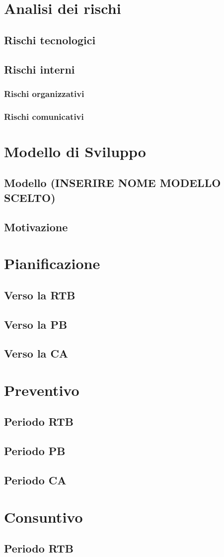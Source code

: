 \documentclass[5pt]{article}
\begin{document}
\section{Analisi dei rischi}
\subsection{Rischi tecnologici}
\subsection{Rischi interni}
\subsubsection{Rischi organizzativi}
\subsubsection{Rischi comunicativi}

\section{Modello di Sviluppo}
\subsection{Modello (INSERIRE NOME MODELLO SCELTO)}
\subsection{Motivazione}

\section{Pianificazione}
\subsection{Verso la RTB}
\subsection{Verso la PB}
\subsection{Verso la CA}

\section{Preventivo}
\subsection{Periodo RTB}
\subsection{Periodo PB}
\subsection{Periodo CA}

\section{Consuntivo}
\subsection{Periodo RTB}
\end{document}
